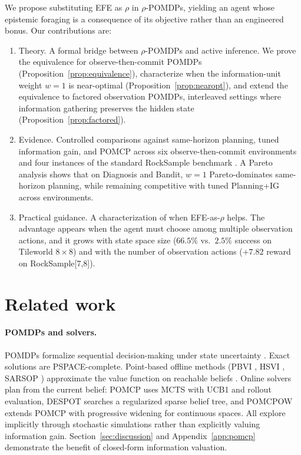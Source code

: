 \documentclass[runningheads]{llncs}
\begin{document}
We propose substituting EFE as $\rho$ in $\rho$-POMDPs, yielding an agent whose epistemic foraging is a consequence of its objective rather than an engineered bonus. Our contributions are:
\begin{enumerate}
    \item Theory. A formal bridge between $\rho$-POMDPs and active inference. We prove the equivalence for observe-then-commit POMDPs (Proposition~\ref{prop:equivalence}), characterize when the information-unit weight $w{=}1$ is near-optimal (Proposition~\ref{prop:nearopt}), and extend the equivalence to factored observation POMDPs, interleaved settings where information gathering preserves the hidden state (Proposition~\ref{prop:factored}).
    \item Evidence. Controlled comparisons against same-horizon planning, tuned information gain, and POMCP \citep{silver2010} across six observe-then-commit environments and four instances of the standard RockSample benchmark \citep{smith2004}. A Pareto analysis shows that on Diagnosis and Bandit, $w{=}1$ Pareto-dominates same-horizon planning, while remaining competitive with tuned Planning+IG across environments.
    \item Practical guidance. A characterization of when EFE-as-$\rho$ helps. The advantage appears when the agent must choose among multiple observation actions, and it grows with state space size ($66.5\%$ vs.\ $2.5\%$ success on Tileworld $8{\times}8$) and with the number of observation actions ($+7.82$ reward on RockSample[7,8]).
\end{enumerate}

\section{Related work}

\paragraph{POMDPs and solvers.}
POMDPs formalize sequential decision-making under state uncertainty \citep{smallwood1973, kaelbling1998}. Exact solutions are PSPACE-complete. Point-based offline methods (PBVI \citep{pineau2003}, HSVI \citep{smith2004}, SARSOP \citep{kurniawati2008}) approximate the value function on reachable beliefs \citep{shani2013}. Online solvers plan from the current belief: POMCP \citep{silver2010} uses MCTS with UCB1 and rollout evaluation, DESPOT \citep{ye2017} searches a regularized sparse belief tree, and POMCPOW \citep{sunberg2018} extends POMCP with progressive widening for continuous spaces. All explore implicitly through stochastic simulations rather than explicitly valuing information gain. Section~\ref{sec:discussion} and Appendix~\ref{app:pomcp} demonstrate the benefit of closed-form information valuation.
\end{document}
